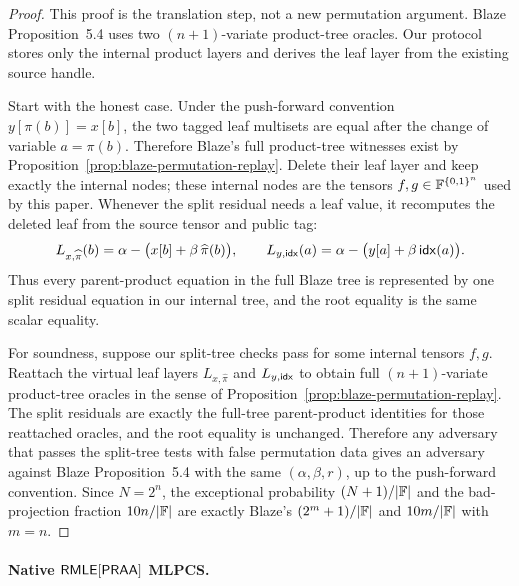 \begin{proof}
This proof is the translation step, not a new permutation argument.  Blaze
Proposition~5.4 uses two \((n+1)\)-variate product-tree oracles.  Our protocol
stores only the internal product layers and derives the leaf layer from the
existing source handle.

Start with the honest case.  Under the push-forward convention
\(y[\pi(b)]=x[b]\), the two tagged leaf multisets are equal after the change of
variable \(a=\pi(b)\).  Therefore Blaze's full product-tree witnesses exist by
Proposition~\ref{prop:blaze-permutation-replay}.  Delete their leaf layer and
keep exactly the internal nodes; these internal nodes are the tensors
\(f,g\in\mathbb{F}^{\{0,1\}^n}\) used by this paper.  Whenever the split residual needs a
leaf value, it recomputes the deleted leaf from the source tensor and public
tag:
\[
  L_{x,\widehat\pi}(b)
  =
  \alpha-\bigl(x[b]+\beta\,\widehat\pi(b)\bigr),
  \qquad
  L_{y,\mathsf{idx}}(a)
  =
  \alpha-\bigl(y[a]+\beta\,\mathsf{idx}(a)\bigr).
\]
Thus every parent-product equation in the full Blaze tree is represented by
one split residual equation in our internal tree, and the root equality is the
same scalar equality.

For soundness, suppose our split-tree checks pass for some internal tensors
\(f,g\).  Reattach the virtual leaf layers \(L_{x,\widehat\pi}\) and
\(L_{y,\mathsf{idx}}\) to obtain full \((n+1)\)-variate product-tree oracles in the
sense of Proposition~\ref{prop:blaze-permutation-replay}.  The split residuals
are exactly the full-tree parent-product identities for those reattached
oracles, and the root equality is unchanged.  Therefore any adversary that
passes the split-tree tests with false permutation data gives an adversary
against Blaze Proposition~5.4 with the same \((\alpha,\beta,r)\), up to the
push-forward convention.  Since \(N=2^n\), the exceptional probability
\((N+1)/|\mathbb{F}|\) and the bad-projection fraction \(10n/|\mathbb{F}|\) are exactly Blaze's
\((2^m+1)/|\mathbb{F}|\) and \(10m/|\mathbb{F}|\) with \(m=n\).
\end{proof}

\paragraph{Native \(\mathsf{RMLE}[\mathsf{PRAA}]\) MLPCS.}


